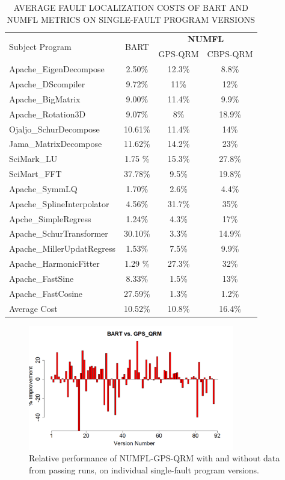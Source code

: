 \begin{table}[htbp!]
\caption{AVERAGE FAULT LOCALIZATION COSTS OF BART AND NUMFL METRICS ON SINGLE-FAULT PROGRAM VERSIONS}
\label{tableBARTvsNUMFL}
\centering
      \begin{tabular}{|l|c|c|c|}
      \hline
\multirow{2}{*}{Subject Program}	& \multirow{2}{*}{BART}&	\multicolumn{2}{|c|}{{\bf NUMFL}}	\\	\cline{3-4}
& & GPS-QRM	&CBPS-QRM \\ \hline
Apache\_EigenDecompose &	2.50\%&	12.3\%	&	8.8\%	\\	\hline
Apache\_DScompiler&	9.72\%&	11\%	&	12\%	\\	\hline
Apache\_BigMatrix	&	9.00\%&11.4\%	&	9.9\%	\\	\hline
Apache\_Rotation3D&	9.07\%&	8\%	&	18.9\%	\\	\hline
Ojaljo\_SchurDecompose&	10.61\%&	11.4\%	&	14\%	\\	\hline
Jama\_MatrixDecompose	&11.62\%&	14.2\%	&	23\%	\\	\hline
SciMark\_LU&1.75	\%&	15.3\%	&	27.8\%	\\	\hline
SciMart\_FFT&	37.78\%&	9.5\%	&	19.8\%	\\	\hline
Apache\_SymmLQ&	1.70\%&	2.6\%	&	4.4\%	\\	\hline
Apache\_SplineInterpolator&	4.56\%&	31.7\%	&	35\%	\\	\hline
Apche\_SimpleRegress&	1.24\%&	4.3\%	&	17\%	\\	\hline
Apache\_SchurTransformer&	30.10\%&	3.3\%	&	14.9\%	\\	\hline
Apache\_MillerUpdatRegress&	1.53\%&	7.5\%	&	9.9\%	\\	\hline
Apache\_HarmonicFitter&1.29	\%&	27.3\%	&	32\%	\\	\hline
Apache\_FastSine&	8.33\%&	1.5\%	&	13\%	\\	\hline
Apache\_FastCosine	&	27.59\%&1.3\%	&	1.2\%	\\	\hline
Average Cost	&	10.52\%&10.8\%	&	16.4\%	\\	\hline
\end{tabular}
\end{table}

\begin{figure}[!thpb]
\centering
\includegraphics[width=0.8\textwidth]{chapter4_BARTvsGPS_QRM.pdf}
\caption{Relative performance of NUMFL-GPS-QRM with and without data from passing runs, on individual single-fault program versions.}
\label{BARTvsQRM}
\end{figure}

